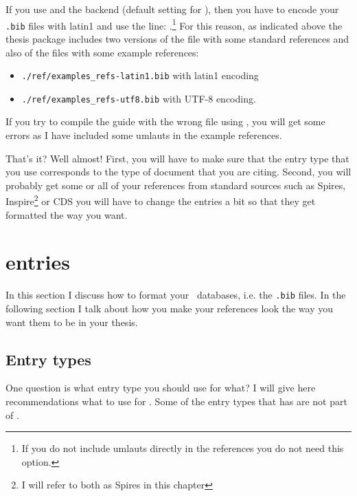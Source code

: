 If you use  and the  backend (default
setting for ), then you have to encode your \texttt{.bib}
files with latin1 and use the line:
.\footnote{%
  If you do not include umlauts directly in the references you do not
  need this option.}
For this reason, as indicated above the thesis package includes two
versions of the file with some standard references and also of the
files with some example references:
\begin{itemize}
\setlength{\parskip}{0pt}\setlength{\itemsep}{0pt}
\item \texttt{./ref/examples\_refs-latin1.bib} with latin1 encoding
\item \texttt{./ref/examples\_refs-utf8.bib} with UTF-8 encoding.
\end{itemize}
If you try to compile the guide with the wrong file using \BibTeX, you
will get some errors as I have included some umlauts in the example
references.

That's it? Well almost! First, you will have to make sure that the
entry type that you use corresponds to the type of document that you
are citing. Second, you will probably get some or all of your
references from standard sources such as Spires, Inspire\footnote{I
  will refer to both as Spires in this chapter} or CDS you will have
to change the entries a bit so that they get formatted the way you want.


\section{\BibTeX{} entries}
\label{sec:ref:bib}

In this section I discuss how to format your \BibTeX\ databases,
i.e. the \texttt{.bib} files. In the following section I talk about
how you make your references look the way you want them to be in your
thesis.

\subsection{Entry types}
\label{sec:ref:entry}

One question is what entry type you should use for what? I will
give here recommendations what to use for
. Some of the entry types that 
has are not part of \BibTeX.

